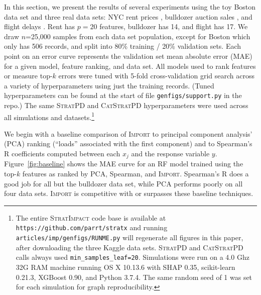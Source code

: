 \documentclass[smallextended]{svjour3}       %
\newcommand{\figref}[1]{Figure~\ref{#1}}
\newcommand{\cut}[1]{}
\newcommand{\Impo}{\fontfamily{cmr}\textsc{Import}}
\newcommand{\simp}{\fontfamily{cmr}\textsc{\small StratImpact}}
\newcommand{\spd}{\fontfamily{cmr}\textsc{\small StratPD}}
\newcommand{\cspd}{\fontfamily{cmr}\textsc{\small CatStratPD}}
\begin{document}
In this section, we present the results of several experiments using the toy Boston data set and three real data sets: NYC rent prices \citep{rent}, bulldozer auction sales \citep{bulldozer}, and flight delays \citep{flights}. Rent has $p=20$ features, bulldozer has 14, and flight has 17. We draw $n$=25,000 samples from each data set population, except for Boston which only has 506 records, and split into 80\% training / 20\% validation sets. Each point on an error curve represents the validation set mean absolute error (MAE) for a given model, feature ranking, and data set. All models used to rank features or measure top-$k$ errors were tuned with 5-fold cross-validation grid search across a variety of hyperparameters using just the training records. (Tuned hyperparameters can be found at the start of file {\tt\small genfigs/support.py} in the repo.) The same \spd{} and \cspd{} hyperparameters were used across all simulations and datasets.\footnote{
The entire \simp{} code base is available at {\tt\small https://github.com/parrt/stratx} and running {\tt\small articles/imp/genfigs/RUNME.py} will regenerate all figures in this paper, after downloading the three Kaggle data sets.  \spd{} and \cspd{} calls always used {\tt\small min\_samples\_leaf=20}. Simulations were run on a 4.0 Ghz 32G RAM machine running OS X 10.13.6 with SHAP 0.35, scikit-learn 0.21.3, XGBoost 0.90, and Python 3.7.4. The same random seed of 1 was set for each simulation for graph reproducibility.}

We begin with a baseline comparison of \Impo{} to principal component analysis' (PCA) ranking (``loads'' associated with the first component) and to Spearman's R coefficients computed between each $x_j$ and the response variable $y$.  \figref{fig:baseline} shows the MAE curve for an RF model trained using the top-$k$ features as ranked by PCA, Spearman, and \Impo. Spearman's R does a good job for all but the bulldozer data set, while PCA performs poorly on all four data sets. \Impo{} is competitive with or surpasses these baseline techniques. 

\cut{
\figref{fig:baseline} also shows the error curve for the features ranked by ordinary least squares (OLS); a feature's score is its $\beta$ coefficient divided by its standard error. (OLS is not applicable to the bulldozer data set because it has many high-cardinality categorical explanatory variables, which would create tens of thousands of dummy variables.) 

OLS curves are similar to \Impo's except for rent in \figref{fig:baseline}d and are included as a common reference curve on subsequent graphs.
}
\end{document}
